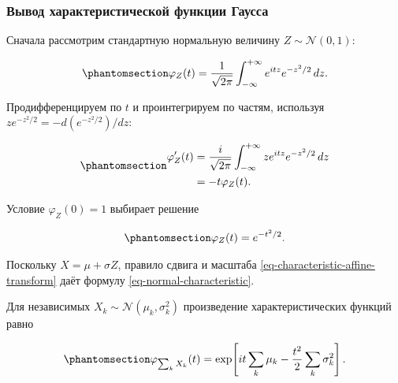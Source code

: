 \documentclass[
  russian,
  11pt,
  a4paper,
  open=any]{scrbook}
\begin{document}
\begin{bookderivation}

\subsubsection{Вывод характеристической функции
Гаусса}\label{ux432ux44bux432ux43eux434-ux445ux430ux440ux430ux43aux442ux435ux440ux438ux441ux442ux438ux447ux435ux441ux43aux43eux439-ux444ux443ux43dux43aux446ux438ux438-ux433ux430ux443ux441ux441ux430}

Сначала рассмотрим стандартную нормальную величину
\(Z\sim\mathcal N(0,1)\):

\begin{equation}\protect\phantomsection\label{eq-standard-normal-characteristic-integral}{
\varphi_Z(t)=
\frac{1}{\sqrt{2\pi}}
\int_{-\infty}^{+\infty}e^{itz}e^{-z^2/2}\,dz.
}\end{equation}

Продифференцируем по \(t\) и проинтегрируем по частям, используя
\(z e^{-z^2/2}=-d(e^{-z^2/2})/dz\):

\begin{equation}\protect\phantomsection\label{eq-standard-normal-characteristic-ode}{
\begin{aligned}
\varphi_Z'(t)
&=\frac{i}{\sqrt{2\pi}}
\int_{-\infty}^{+\infty}z e^{itz}e^{-z^2/2}\,dz\\
&=-t\varphi_Z(t).
\end{aligned}
}\end{equation}

Условие \(\varphi_Z(0)=1\) выбирает решение

\begin{equation}\protect\phantomsection\label{eq-standard-normal-characteristic}{
\varphi_Z(t)=e^{-t^2/2}.
}\end{equation}

Поскольку \(X=\mu+\sigma Z\), правило сдвига и масштаба
\ref{eq-characteristic-affine-transform} даёт формулу
\ref{eq-normal-characteristic}.

\end{bookderivation}

Для независимых \(X_k\sim\mathcal N(\mu_k,\sigma_k^2)\) произведение
характеристических функций равно

\begin{equation}\protect\phantomsection\label{eq-gaussian-sum-characteristic}{
\varphi_{\sum_k X_k}(t)=
\exp\!\left[
it\sum_k\mu_k-
\frac{t^2}{2}\sum_k\sigma_k^2
\right].
}\end{equation}
\end{document}
